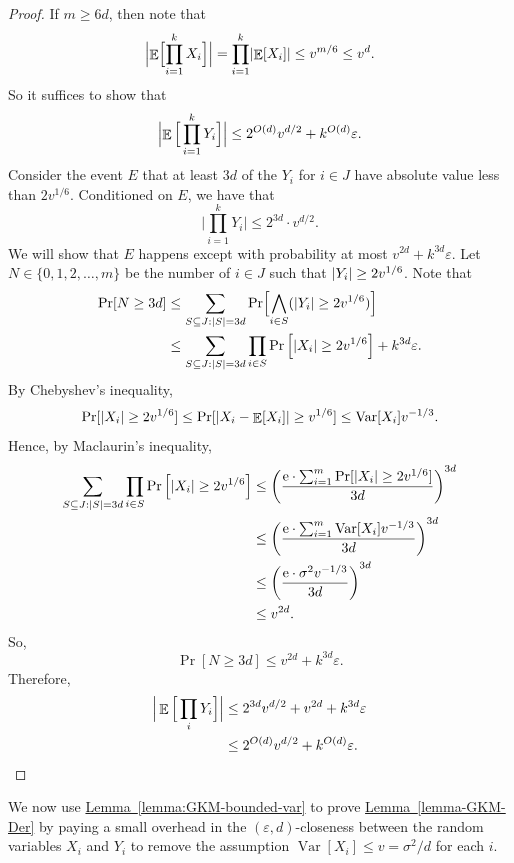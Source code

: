 \documentclass[11pt]{article}
\numberwithin{equation}{section}
\theoremstyle{definition}
\theoremstyle{plain}
\newcommand{\eee}{\mathrm e}
\newcommand{\expref}[2]{\hyperref[#2]{#1~\ref{#2}}}
\def\eps{\varepsilon}
\DeclarePairedDelimiter{\abs}{\lvert}{\rvert}
\DeclareMathOperator*{\E}{\mathbb{E}}                 %
\DeclareMathOperator*{\Var}{Var}                 %
\begin{document}
\begin{proof}
    If $m \ge 6d$, then note that
    \[
      \Bigl| \E \Bigl[ \prod_{i=1}^k X_i \Bigr] \Bigr|
      = \prod_{i=1}^k \abs{ \E[X_i] }
      \le v^{m/6}
      \le v^{d}.
    \]
    So it suffices to show that
    \[
      \Bigl| \E \Big[ \prod_{i=1}^k Y_i \Big] \Bigr| 
      \le 2^{O(d)} v^{d/2} + k^{O(d)} \eps.
    \]
    Consider the event $E$ that at least $3d$ of the $Y_i$ for $i \in J$ have absolute value less than $2 v^{1/6}$.
    Conditioned on $E$, we have that
    \[
      \Big| \prod_{i=1}^k Y_i \Big| \le  2^{3d} \cdot v^{d/2} .
    \]
    We will show that $E$ happens except with probability at most $v^{2d} + k^{3d} \eps$.
    Let $N \in \{0, 1, 2, \ldots, m\}$ be the number of $i \in J$ such that $\abs{Y_i} \ge 2 v^{1/6}$.
    Note that
    \begin{align*}
      \Pr[ N \ge 3d ]
      &\le \sum_{S \subseteq J: \abs{S} = 3d} \Pr\Bigl[ \bigwedge_{i \in S} ( \abs{Y_i} \ge 2 v^{1/6} ) \Bigr] \\
      &\le \sum_{S \subseteq J: \abs{S} = 3d} \prod_{i \in S} \Pr\left[ \abs{X_i} \ge 2 v^{1/6} \right] + k^{3d} \eps .
    \end{align*}
    By Chebyshev's inequality,
    \[
      \Pr[ \abs{X_i} \ge 2 v^{1/6} ]
      \le \Pr[ \abs{X_i - \E[X_i]} \ge v^{1/6} ]
      \le \Var[X_i] v^{-1/3} .
    \]
    Hence, by Maclaurin's inequality,
    \begin{align*}
      \sum_{S \subseteq J: \abs{S} = 3d} \prod_{i \in S} \Pr\left[ \abs{X_i} \ge 2 v^{1/6} \right]
      &\le \left( \frac{\eee\cdot \sum_{i=1}^m \Pr[ \abs{X_i} \ge 2 v^{1/6} ] }{ 3d } \right)^{3d} \\
      &\le \left( \frac{\eee\cdot \sum_{i=1}^m \Var[X_i] v^{-1/3} }{ 3d } \right)^{3d} \\
      &\le \left( \frac{\eee\cdot \sigma^2 v^{-1/3} }{ 3d } \right)^{3d} \\
      &\le v^{2d} .
    \end{align*}
    So,
    \[
      \Pr[ N \ge 3d] \le v^{2d} + k^{3d} \eps .
    \]
    Therefore,
    \begin{align*}
      \Big| \E \Big[\prod_i Y_i \Big] \Big|
      &\le 2^{3d} v^{d/2} + v^{2d} + k^{3d} \eps \\
      &\le 2^{O(d)} v^{d/2} + k^{O(d)} \eps . \qedhere
    \end{align*}
  \end{proof}

  We now use \expref{Lemma}{lemma:GKM-bounded-var} to prove \expref{Lemma}{lemma-GKM-Der} by paying a small overhead in the $(\eps, d)$-closeness between the random variables $X_i$ and $Y_i$ to remove the assumption $\Var[X_i] \le v = \sigma^2/d$ for each $i$.
\end{document}
